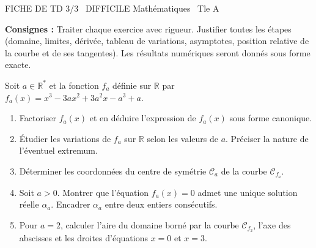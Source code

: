 \documentclass[11pt]{article}
\begin{document}
\begin{tcolorbox}[enhanced,colback=popink,colframe=popink,arc=10pt,boxrule=0pt,left=12pt,right=12pt,top=9pt,bottom=9pt]
{\color{white}\popxbold\small FICHE DE TD 3/3 \textbullet\ DIFFICILE \hfill Mathématiques \textbullet\ Tle A\par}
\end{tcolorbox}
\vspace{4pt}
\noindent\textbf{Consignes :} Traiter chaque exercice avec rigueur. Justifier toutes les étapes (domaine, limites, dérivée, tableau de variations, asymptotes, position relative de la courbe et de ses tangentes). Les résultats numériques seront donnés sous forme exacte.

\begin{exercice}
Soit $a \in \mathbb{R}^*$ et la fonction $f_a$ définie sur $\mathbb{R}$ par $f_a(x) = x^3 - 3ax^2 + 3a^2x - a^3 + a$.
\begin{enumerate}
    \item Factoriser $f_a(x)$ et en déduire l'expression de $f_a(x)$ sous forme canonique.
    \item Étudier les variations de $f_a$ sur $\mathbb{R}$ selon les valeurs de $a$. Préciser la nature de l'éventuel extremum.
    \item Déterminer les coordonnées du centre de symétrie $\mathcal{C}_a$ de la courbe $\mathcal{C}_{f_a}$.
    \item Soit $a > 0$. Montrer que l'équation $f_a(x) = 0$ admet une unique solution réelle $\alpha_a$. Encadrer $\alpha_a$ entre deux entiers consécutifs.
    \item Pour $a = 2$, calculer l'aire du domaine borné par la courbe $\mathcal{C}_{f_2}$, l'axe des abscisses et les droites d'équations $x = 0$ et $x = 3$.
\end{enumerate}
\end{exercice}
\end{document}
